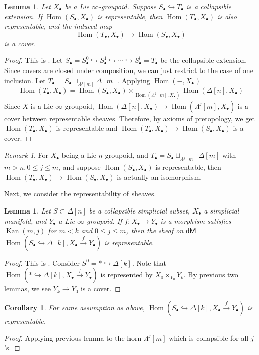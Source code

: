 \documentclass[12pt]{amsart}
\newtheorem{cor}[thm]{Corollary}
\newtheorem{lem}[thm]{Lemma}
\theoremstyle{definition}
\theoremstyle{remark}
\newtheorem{rem}[thm]{Remark}
\numberwithin{equation}{section}
\newcommand{\1}{{\mathbb{1}}}
\newcommand{\dm}{\mathsf{dM}}
\newcommand{\bt}{\bullet}
\newcommand{\Hom}{\operatorname{Hom}}
\newcommand{\kan}{\operatorname{Kan}}
\begin{document}
\begin{lem}\label{c1}
    Let $X_{\bt}$ be a Lie $\infty$-groupoid. Suppose $S_{\bt}\hookrightarrow T_{\bt}$ is a collapsible extension. If $\Hom(S_{\bt}, X_{\bt})$ is representable, then $\Hom(T_{\bt}, X_{\bt})$ is also representable, and the induced map 
    $$
    \Hom(T_{\bt}, X_{\bt}) \to \Hom(S_{\bt}, X_{\bt})
    $$
    is a cover.
\end{lem}
\begin{proof} This is \cite[Lemma 3.7]{RZ20}. 
    Let $S_{\bullet} = S^0_{\bullet} \hookrightarrow
        S^1_{\bullet} \hookrightarrow \cdots \hookrightarrow S^l_{\bullet} = T_{\bt}$ be the collapsible extension. Since covers are closed under composition, we can just restrict to the case of one inclusion. Let $T_{\bt} = S_{\bt} \sqcup_{\Lambda^j[m]} \Delta[m]$. Applying $\Hom(-, X_{\bt})$
        \begin{equation*}
            \Hom(T_{\bt}, X_{\bt}) = \Hom(S_{\bt}, X_{\bt}) \times_{\Hom(\Lambda^j[m], X_{\bt})}  \Hom(\Delta[n], X_{\bt})
        \end{equation*}
        Since $X$ is a Lie $\infty$-groupoid, $\Hom(\Delta[n], X_{\bt})\to \Hom(\Lambda^j[m], X_{\bt})$ is a cover between representable sheaves. Therefore, by axioms of pretopology, we get $\Hom(T_{\bt}, X_{\bt})$ is representable and $
    \Hom(T_{\bt}, X_{\bt}) \to \Hom(S_{\bt}, X_{\bt})$ is a cover.
\end{proof}
\begin{rem}%
    For $X_{\bt}$ being a Lie $n$-groupoid, and $T_{\bt} = S_{\bt} \sqcup_{\Lambda^j[m]} \Delta[m]$ with $m > n, 0\le j \le m$, and suppose $\Hom(S_{\bt}, X_{\bt})$ is representable, then $
    \Hom(T_{\bt}, X_{\bt}) \to \Hom(S_{\bt}, X_{\bt})$  is actually an isomorphism.
\end{rem}
Next, we consider the representability of sheaves.
\begin{lem}
\label{c2}
    Let $S\subset \Delta[n]$ be a collapsible simplicial subset, $X_{\bt}$ a simplicial manifold, and $Y_{\bt}$ a Lie $\infty$-groupoid. If $f: X_{\bt}\to Y_{\bt}$ is a morphism satisfies $\kan(m, j)$ for $m < k$ and $0 \le j \le m$, then the sheaf on $\dm$ $\Hom(S_{\bt} \hookrightarrow \Delta[k], X_{\bt} \stackrel{f}{\to} Y_{\bt})$ is representable.
\end{lem}
\begin{proof}
    This is \cite[Lemma 3.9]{RZ20}. Consider $S^0 = * \hookrightarrow \Delta[k]$. Note that $\Hom(* \hookrightarrow \Delta[k], X_{\bt} \stackrel{f}{\to} Y_{\bt})$ is represented by $X_0 \times_{Y_0} Y_k$. By previous two lemmas, we see $Y_k \to Y_0$ is a cover.
\end{proof}
\begin{cor}
    For same assumption as above, $\Hom(S_{\bt} \hookrightarrow \Delta[k], X_{\bt} \stackrel{f}{\to} Y_{\bt})$ is representable.
\end{cor}
\begin{proof}
    Applying previous lemma to the horn $\Lambda^j[m]$ which is collapsible for all $j$'s.
\end{proof}
\end{document}
